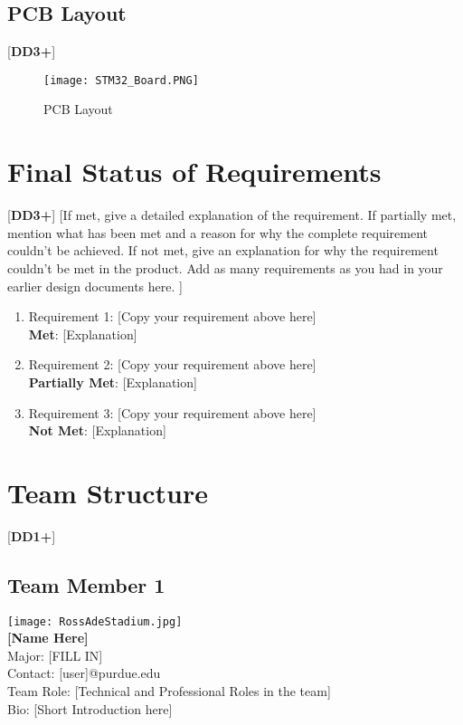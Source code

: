 \documentclass[letterpaper, 11pt]{article}
\begin{document}
\clearpage
\subsection{PCB Layout}
[\textbf{DD3+}]
\begin{figure}[h]
    \centering
    \texttt{[image: STM32\_Board.PNG]} %
    \caption{PCB Layout}
\end{figure}

\clearpage
\section{Final Status of Requirements}
[\textbf{DD3+}]
[If met, give a detailed explanation of the requirement. If partially met, mention what has been met and a reason for why the complete requirement couldn’t be achieved. If not met, give an explanation for why the requirement couldn’t be met in the product. Add as many requirements as you had in your earlier design documents here. ]
\begin{enumerate}
    \item Requirement 1: [Copy your requirement above here] \\
    \textbf{Met}: [Explanation] 
    \item Requirement 2: [Copy your requirement above here] \\
    \textbf{Partially Met}: [Explanation] 
    \item Requirement 3: [Copy your requirement above here] \\
    \textbf{Not Met}: [Explanation] 
\end{enumerate}

\clearpage
\section{Team Structure}
[\textbf{DD1+}]
\subsection{Team Member 1}
\texttt{[image: RossAdeStadium.jpg]} \\
\textbf{[Name Here]}\\
Major: [FILL IN]\\
Contact: [user]@purdue.edu\\
Team Role: [Technical and Professional Roles in the team] \\
Bio: [Short Introduction here]
\end{document}
